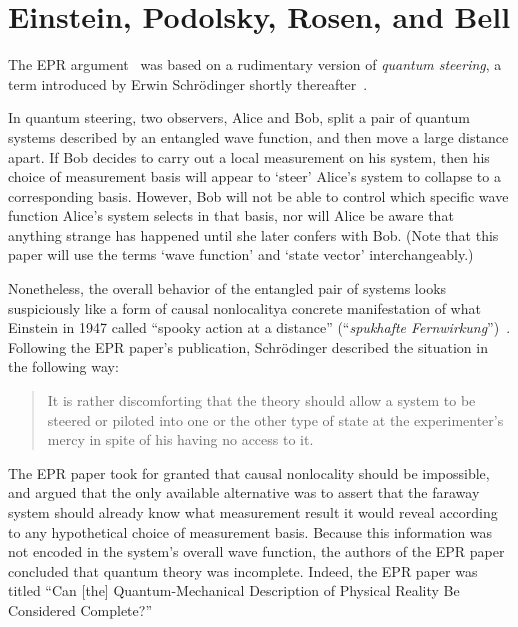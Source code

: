 \documentclass[12pt,english,prl,superscriptaddress,nobibnotes,nofootinbib]{revtex4-2}
\begin{document}
\section{Einstein, Podolsky, Rosen, and Bell\label{sec:Einstein-Podolsky-Rosen-and-Bell}}

The EPR argument~\citep{EinsteinPodolskyRosen:1935cqmdprbcc} was
based on a rudimentary version of \emph{quantum steering}, a term
introduced by Erwin Schr{\"o}dinger shortly thereafter~\citep{Schrodinger:1935dprbss,Schrodinger:1936prbss}. 

In quantum steering, two observers, Alice and Bob, split a pair of
quantum systems described by an entangled wave function, and then
move a large distance apart. If Bob decides to carry out a local measurement
on his system, then his choice of measurement basis will appear to
\textquoteleft steer\textquoteright{} Alice's system to collapse to
a corresponding basis. However, Bob will not be able to control which
specific wave function Alice's system selects in that basis, nor will
Alice be aware that anything strange has happened until she later
confers with Bob. (Note that this paper will use the terms \textquoteleft wave
function\textquoteright{} and \textquoteleft state vector\textquoteright{}
interchangeably.) 

Nonetheless, the overall behavior of the entangled pair of systems
looks suspiciously like a form of causal nonlocality\textemdash a
concrete manifestation of what Einstein in 1947 called ``spooky action
at a distance'' (``\emph{spukhafte Fernwirkung}'')~\citep{Einstein:1947ltmb}.
Following the EPR paper's publication, Schr{\"o}dinger described the situation
in the following way: 
\begin{quotation}
It is rather discomforting that the theory should allow a system to
be steered or piloted into one or the other type of state at the experimenter's
mercy in spite of his having no access to it.~\citep{Schrodinger:1935dprbss}
\end{quotation}

The EPR paper took for granted that causal nonlocality should be impossible,
and argued that the only available alternative was to assert that
the faraway system should already know what measurement result it
would reveal according to any hypothetical choice of measurement basis.
Because this information was not encoded in the system's overall wave
function, the authors of the EPR paper concluded that quantum theory
was incomplete. Indeed, the EPR paper was titled ``Can {[}the{]}
Quantum-Mechanical Description of Physical Reality Be Considered Complete?''
\end{document}

